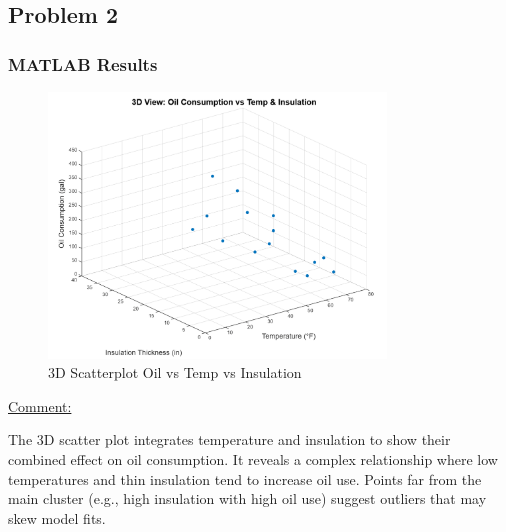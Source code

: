 \documentclass[12pt]{article}
\begin{document}
\subsection*{Problem 2}
\subsubsection*{MATLAB Results}
\begin{figure}[H]
    \centering
    \includegraphics[width=0.8\textwidth]{7.png}
    \caption{3D Scatterplot Oil vs Temp vs Insulation}
\end{figure}
\newpage
\begin{adjustwidth}{0cm}{0cm}
\uline{Comment:} 
\end{adjustwidth}
The 3D scatter plot integrates temperature and insulation to show their combined effect on oil consumption. It reveals a complex relationship where low temperatures and thin insulation tend to increase oil use. Points far from the main cluster (e.g., high insulation with high oil use) suggest outliers that may skew model fits.
\end{document}
